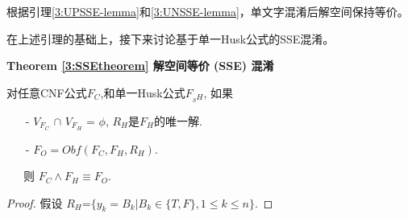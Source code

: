 根据引理\ref{3:UPSSE-lemma}和\ref{3:UNSSE-lemma}，单文字混淆后解空间保持等价。

在上述引理的基础上，接下来讨论基于单一Husk公式的SSE混淆。

\textbf{Theorem \ref{3:SSEtheorem} 解空间等价 (SSE) 混淆}

对任意CNF公式$F_C$,和单一Husk公式$F_{_SH}$, 如果
\begin{enumerate}
 \item[-] $V_{F_C}$ $\cap$ $V_{F_H}$ = $\phi$, $R_H$是$F_H$的唯一解.
 \item[-] $F_O=Obf(F_C,F_H,R_H)$.
\end{enumerate}
~~~则 $F_C\wedge F_H \equiv F_O$.
\begin{proof}

假设 $R_H$=$\{y_k=B_k| B_k \in \{T,F\}, 1\leqslant k\leqslant n\}$.


\end{proof}
